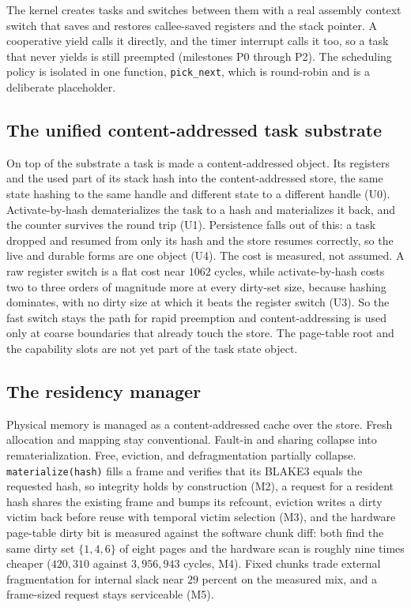 \documentclass[10pt,twocolumn]{article}
\begin{document}
The kernel creates tasks and switches between them with a real assembly context
switch that saves and restores callee-saved registers and the stack pointer. A
cooperative yield calls it directly, and the timer interrupt calls it too, so a
task that never yields is still preempted (milestones P0 through P2). The
scheduling policy is isolated in one function, \texttt{pick\_next}, which is
round-robin and is a deliberate placeholder.

\subsection{The unified content-addressed task substrate}

On top of the substrate a task is made a content-addressed object. Its registers
and the used part of its stack hash into the content-addressed store, the same state hashing
to the same handle and different state to a different handle (U0). Activate-by-hash
dematerializes the task to a hash and materializes it back, and the counter
survives the round trip (U1). Persistence falls out of this: a task dropped and
resumed from only its hash and the store resumes correctly, so the live and
durable forms are one object (U4). The cost is measured, not assumed. A raw
register switch is a flat cost near $1062$ cycles, while activate-by-hash costs
two to three orders of magnitude more at every dirty-set size, because hashing
dominates, with no dirty size at which it beats the register switch (U3). So the
fast switch stays the path for rapid preemption and content-addressing is used
only at coarse boundaries that already touch the store. The page-table root and
the capability slots are not yet part of the task state object.

\subsection{The residency manager}

Physical memory is managed as a content-addressed cache over the store. Fresh
allocation and mapping stay conventional. Fault-in and sharing collapse into
rematerialization. Free, eviction, and defragmentation partially collapse.
\texttt{materialize(hash)} fills a frame and verifies that its BLAKE3 equals the
requested hash, so integrity holds by construction (M2), a request for a resident
hash shares the existing frame and bumps its refcount, eviction writes a dirty
victim back before reuse with temporal victim selection (M3), and the hardware
page-table dirty bit is measured against the software chunk diff: both find the
same dirty set $\{1,4,6\}$ of eight pages and the hardware scan is roughly nine
times cheaper ($420{,}310$ against $3{,}956{,}943$ cycles, M4). Fixed chunks trade
external fragmentation for internal slack near $29$ percent on the measured mix,
and a frame-sized request stays serviceable (M5).
\end{document}
